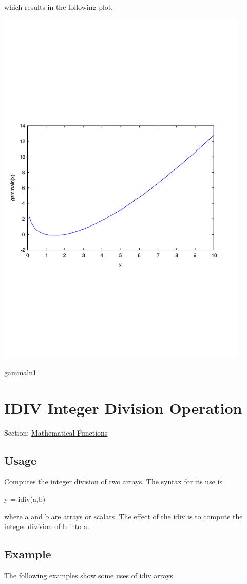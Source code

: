 which results in the following plot.  
\begin{DoxyImage}
\includegraphics[width=12cm]{gammaln1}
\caption{gammaln1}
\end{DoxyImage}
 \hypertarget{mathfunctions_idiv}{}\section{I\-D\-I\-V Integer Division Operation}\label{mathfunctions_idiv}
Section\-: \hyperlink{sec_mathfunctions}{Mathematical Functions} \hypertarget{vtkwidgets_vtkxyplotwidget_Usage}{}\subsection{Usage}\label{vtkwidgets_vtkxyplotwidget_Usage}
Computes the integer division of two arrays. The syntax for its use is \begin{DoxyVerb}   y = idiv(a,b)
\end{DoxyVerb}
 where {\ttfamily a} and {\ttfamily b} are arrays or scalars. The effect of the {\ttfamily idiv} is to compute the integer division of {\ttfamily b} into {\ttfamily a}. \hypertarget{variables_struct_Example}{}\subsection{Example}\label{variables_struct_Example}
The following examples show some uses of {\ttfamily idiv} arrays.


